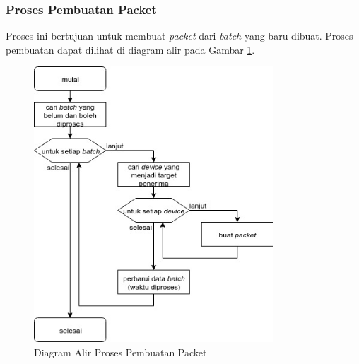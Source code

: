 \subsubsection{Proses Pembuatan Packet}
\par Proses ini bertujuan untuk membuat \textit{packet} dari \textit{batch} yang baru dibuat. Proses pembuatan dapat dilihat di diagram alir pada Gambar \ref{flowchart_pembuatan_packet}.
\begin{figure}[H]
	\centering\includegraphics[width=0.8\textwidth]{bab3/img/flowchart-pembuatan_packet.jpg}
	\caption{Diagram Alir Proses Pembuatan Packet} \label{flowchart_pembuatan_packet}
\end{figure}
\clearpage


